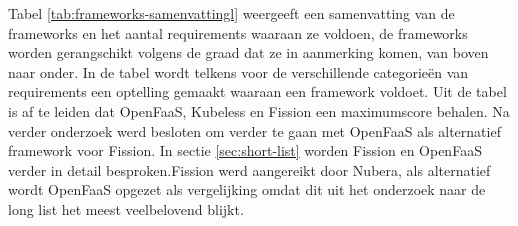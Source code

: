 Tabel \ref{tab:frameworks-samenvattingl} weergeeft een samenvatting van de frameworks en het aantal requirements waaraan ze voldoen, de frameworks worden gerangschikt volgens de graad dat ze in aanmerking komen, van boven naar onder. In de tabel wordt telkens voor de verschillende categorieën van requirements een optelling gemaakt waaraan een framework voldoet. Uit de tabel is af te leiden dat OpenFaaS, Kubeless en Fission een maximumscore behalen. Na verder onderzoek werd besloten om verder te gaan met OpenFaaS als alternatief framework voor Fission. In sectie \ref{sec:short-list} worden Fission en OpenFaaS verder in detail besproken.Fission werd aangereikt door Nubera, als alternatief wordt OpenFaaS opgezet als vergelijking omdat dit uit het onderzoek naar de long list het meest veelbelovend blijkt. 
\\
\begin{table}[]
    \centering
\end{table}
